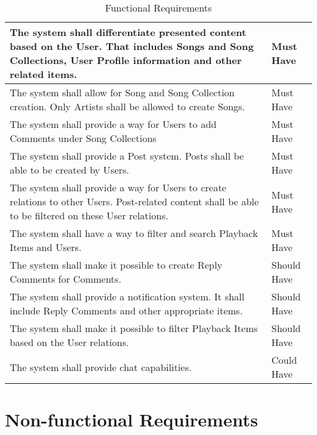\begin{table}[h!]
\begin{tabular}{|p{12cm}|p{3cm}|}
        \hline
        The system shall differentiate presented content based on the User. That includes Songs and Song Collections, User Profile information and other related items. & Must Have \\
        \hline
        The system shall allow for Song and Song Collection creation. Only Artists shall be allowed to create Songs. & Must Have\\
        \hline
        The system shall provide a way for Users to add Comments under Song Collections                                                                                 & Must Have         \\
        \hline
        The system shall provide a Post system. Posts shall be able to be created by Users. & Must Have \\
        \hline
        The system shall provide a way for Users to create relations to other Users. Post-related content shall be able to be filtered on these User relations. & Must Have \\
        \hline
        The system shall have a way to filter and search Playback Items and Users.                                                                                      & Must Have         \\
        \hline
        The system shall make it possible to create Reply Comments for Comments.                                                                                        & Should Have       \\
        \hline
        The system shall provide a notification system. It shall include Reply Comments and other appropriate items.                                                                                              & Should Have       \\
        \hline
        The system shall make it possible to filter Playback Items based on the User relations. & Should Have \\
        \hline
        The system shall provide chat capabilities.                                                                                                                     & Could Have        \\
        \hline
    \end{tabular}
    \caption{Functional Requirements}
\end{table}


\clearpage


\section{Non-functional Requirements}

